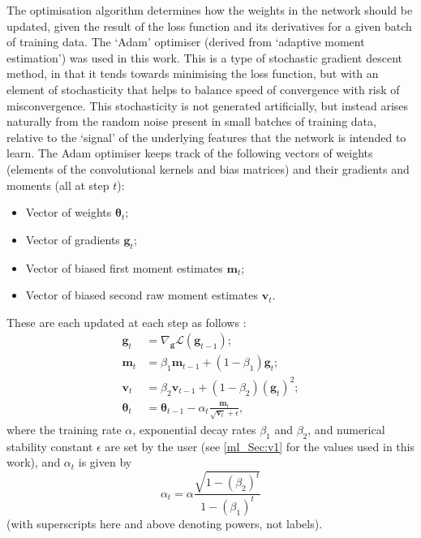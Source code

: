 The optimisation algorithm determines how the weights in the network should be updated, given the result of the loss function and its derivatives for a given batch of training data. The `Adam' optimiser (derived from `adaptive moment estimation') was used in this work. This is a type of stochastic gradient descent method, in that it tends towards minimising the loss function, but with an element of stochasticity that helps to balance speed of convergence with risk of misconvergence. This stochasticity is not generated artificially, but instead arises naturally from the random noise present in small batches of training data, relative to the `signal' of the underlying features that the network is intended to learn. The Adam optimiser keeps track of the following vectors of weights (elements of the convolutional kernels and bias matrices) and their gradients and moments (all at step $t$):
\begin{itemize}
\item Vector of weights $\bm{\theta}_t$;
\item Vector of gradients $\bm{g}_t$;
\item Vector of biased first moment estimates $\bm{m}_t$;
\item Vector of biased second raw moment estimates $\bm{v}_t$.
\end{itemize}
These are each updated at each step as follows \citep{Kingma2014}:
\begin{align}
\bm{g}_t &= \nabla_{\bm{g}} \mathcal{L} \left( \bm{g}_{t - 1} \right); \\[1em]
%
\bm{m}_t &= \beta_1 \bm{m}_{t - 1} + \left( 1 - \beta_1 \right) \bm{g}_t; \\[1em]
%
\bm{v}_t &= \beta_2 \bm{v}_{t - 1} + \left( 1 - \beta_2 \right) \left( \bm{g}_t \right)^2; \\[1em]
\bm{\theta}_t &= \bm{\theta}_{t - 1} - \alpha_t \frac{\bm{m}_t}
{\sqrt{\bm{v}_t} + \epsilon},
\label{ml_Eqn:theta_update_rule}
\end{align}
where the training rate $\alpha$, exponential decay rates $\beta_1$ and $\beta_2$, and numerical stability constant $\epsilon$ are set by the user (see \autoref{ml_Sec:v1} for the values used in this work), and $\alpha_t$ is given by
\begin{equation}
\alpha_t = \alpha
\frac{\sqrt{1 - \left( \beta_2 \right)^t}}{1 - \left( \beta_1 \right)^t}
\end{equation}
(with superscripts here and above denoting powers, not labels).

